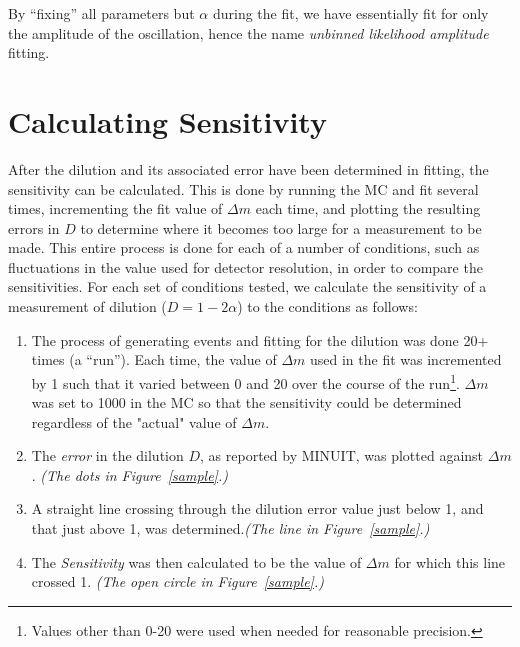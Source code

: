 \documentclass[10pt]{article}
\begin{document}
\noindent By ``fixing'' all parameters but $\alpha$ during the fit, we have essentially fit for only the amplitude of the oscillation, hence the name {\it unbinned likelihood amplitude} fitting.

\section{Calculating Sensitivity \label{calcsens}}

After the dilution and its associated error have been determined in fitting, the sensitivity can be calculated. 
This is done by running the MC and fit several times, incrementing the fit value of $\Delta m$ each time, and plotting the resulting errors in $D$ to determine where it becomes too large for a measurement to be made.  This entire process is done for each of a number of conditions, such as fluctuations in the value used for detector resolution, in order to compare the sensitivities.
For each set of conditions tested, we calculate the sensitivity of a  measurement of dilution ($D = 1-2\alpha$) to the conditions
as follows:

\begin{enumerate}
\item The process of generating events and fitting for the
dilution was done 20+ times (a ``run''). Each time, the value of
$\Delta m$ used in the fit was incremented by 1 such that it
varied between 0 and 20 over the course of the run\footnote{Values
other than 0-20 were used when needed for reasonable precision.}.
$\Delta m$ was set to 1000 in the MC so that the sensitivity could
be determined regardless of the "actual" value of $\Delta m$.

\item The {\em error} in the dilution $D$, as reported by MINUIT,
was plotted against $\Delta m$. {\em (The dots in
Figure~\ref{sample}.)}

\item A straight line crossing through the dilution error value
just below 1, and that just above 1, was determined.{\em (The line
in Figure~\ref{sample}.)}

\item The {\em Sensitivity} was then calculated to be the value of
$\Delta m$ for which this line crossed 1. {\em (The open circle in
Figure~\ref{sample}.)}
\end{enumerate}
\end{document}
